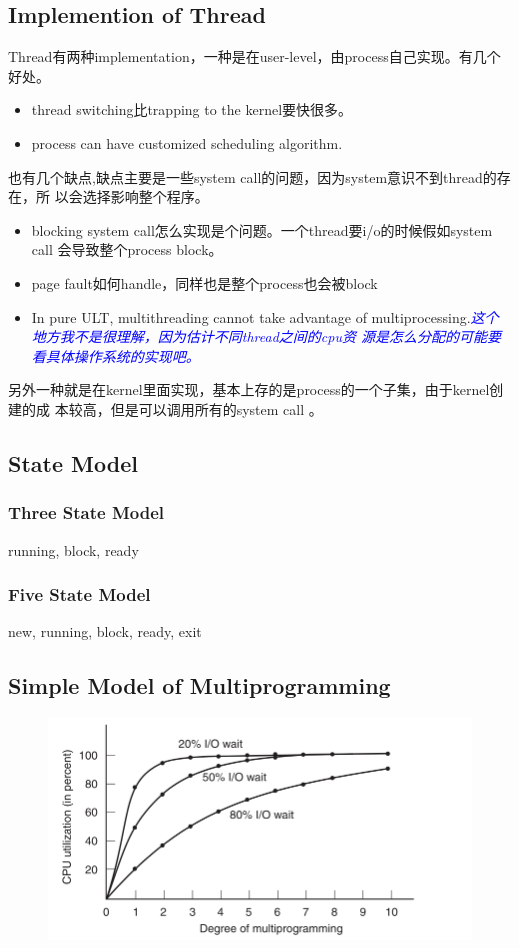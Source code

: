 \documentclass[a4paper]{article}
\newcommand{\problem}[1]{\textcolor{blue}{\textit{#1}}}
\begin{document}
\subsection{Implemention of Thread}
Thread有两种implementation，一种是在user-level，由process自己实现。有几个好处。
\begin{itemize}
\item{thread switching比trapping to the kernel要快很多。}
\item{process can have customized scheduling algorithm.}
\end{itemize}

也有几个缺点,缺点主要是一些system call的问题，因为system意识不到thread的存在，所
以会选择影响整个程序。
\begin{itemize}
\item{blocking system call怎么实现是个问题。一个thread要i/o的时候假如system call
    会导致整个process block。}
\item{page fault如何handle，同样也是整个process也会被block}
\item{ In pure ULT, multithreading cannot take advantage of
    multiprocessing.\problem{这个地方我不是很理解，因为估计不同thread之间的cpu资
      源是怎么分配的可能要看具体操作系统的实现吧。}}
\end{itemize}

另外一种就是在kernel里面实现，基本上存的是process的一个子集，由于kernel创建的成
本较高，但是可以调用所有的system call 。

\subsection{State Model}
\subsubsection{Three State Model}
running, block, ready
\subsubsection{Five State Model}
new, running, block, ready, exit

\subsection{Simple Model of Multiprogramming}
\begin{figure}
  \centering
  \label{cpuutil}
  \includegraphics{cpuutil.png}
\end{figure}
\end{document}
